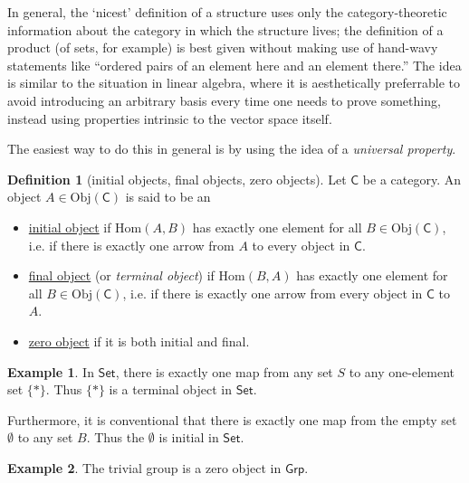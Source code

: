 \documentclass[a4paper]{report}
\newcommand{\defn}[1]{\ul{#1}}
\newcommand{\Obj}{\mathrm{Obj}}
\newcommand{\Hom}{\mathrm{Hom}}
\theoremstyle{definition}
\newtheorem{definition}{Definition}[section]
\newtheorem{example}{Example}[section]
\theoremstyle{plain}
\theoremstyle{remark}
\begin{document}
In general, the `nicest' definition of a structure uses only the category-theoretic information about the category in which the structure lives; the definition of a product (of sets, for example) is best given without making use of hand-wavy statements like ``ordered pairs of an element here and an element there.'' The idea is similar to the situation in linear algebra, where it is aesthetically preferrable to avoid introducing an arbitrary basis every time one needs to prove something, instead using properties intrinsic to the vector space itself.

The easiest way to do this in general is by using the idea of a \emph{universal property}.

\begin{definition}[initial objects, final objects, zero objects]
  Let $\mathsf{C}$ be a category. An object $A \in \Obj(\mathsf{C})$ is said to be an
  \begin{itemize}
    \item \defn{initial object} if $\Hom(A,B)$ has exactly one element for all $B\in \Obj(\mathsf{C})$, i.e. if there is exactly one arrow from $A$ to every object in $\mathsf{C}$.

    \item \defn{final object} (or \emph{terminal object}) if $\Hom(B,A)$ has exactly one element for all $B\in \Obj(\mathsf{C})$, i.e. if there is exactly one arrow from every object in $\mathsf{C}$ to $A$.

    \item \defn{zero object} if it is both initial and final.
  \end{itemize}
  \label{def:initialfinalzeroobject}
\end{definition}

\begin{example}
  In $\mathsf{Set}$, there is exactly one map from any set $S$ to any one-element set $\{*\}$. Thus $\{*\}$ is a terminal object in $\mathsf{Set}$.

  Furthermore, it is conventional that there is exactly one map from the empty set $\emptyset$ to any set $B$. Thus the $\emptyset$ is initial in $\mathsf{Set}$.
\end{example}

\begin{example}
  The trivial group is a zero object in $\mathsf{Grp}$.
\end{example}
\end{document}
